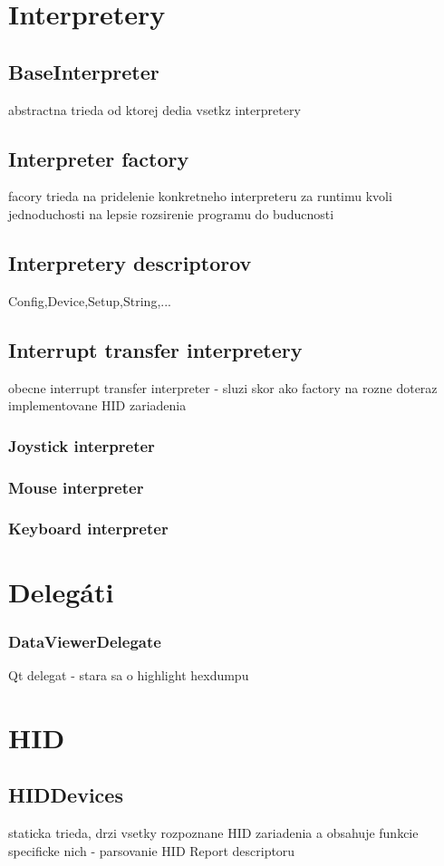 \section{Interpretery}
\subsection{BaseInterpreter}
abstractna trieda od ktorej dedia vsetkz interpretery
\subsection{Interpreter factory}
facory trieda na pridelenie konkretneho interpreteru za runtimu kvoli jednoduchosti na lepsie rozsirenie programu do buducnosti
\subsection{Interpretery descriptorov}
Config,Device,Setup,String,...
\subsection{Interrupt transfer interpretery}
obecne interrupt transfer interpreter - sluzi skor ako factory na rozne doteraz implementovane HID zariadenia
\subsubsection{Joystick interpreter}
\subsubsection{Mouse interpreter}
\subsubsection{Keyboard interpreter}
\section{Delegáti}
\subsubsection{DataViewerDelegate}
Qt delegat - stara sa o highlight hexdumpu
\section{HID}
\subsection{HIDDevices}
staticka trieda, drzi vsetky rozpoznane HID zariadenia a obsahuje funkcie specificke nich - parsovanie HID Report descriptoru
